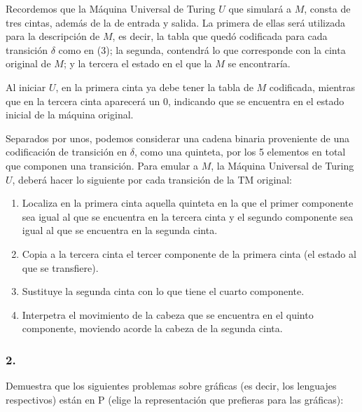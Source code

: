 \documentclass[12pt]{article}
\begin{document}
Recordemos que la Máquina Universal de Turing $U$ que simulará a $M$, consta de tres cintas, además de la de entrada y salida. La primera de ellas
será utilizada para la descripción de $M$, es decir, la tabla que quedó codificada para cada transición $\delta$ como en (3); la segunda, contendrá lo que corresponde con la cinta original de $M$; y la tercera el estado en el que la $M$ se encontraría.

Al iniciar $U$, en la primera cinta ya debe tener la tabla de $M$ codificada, mientras que en la tercera cinta aparecerá un 0, indicando que se encuentra en el estado inicial de la máquina original.

Separados por unos, podemos considerar una cadena binaria proveniente de una codificación de transición en $\delta$, como una quinteta, por los 5 elementos en total que componen una transición. Para emular a $M$, la Máquina Universal de Turing $U$, deberá hacer lo siguiente por cada
transición de la TM original:\\
\begin{enumerate}
\item Localiza en la primera cinta aquella quinteta en la que el primer componente sea igual al que se encuentra en la tercera cinta y el segundo
  componente sea igual al que se encuentra en la segunda cinta.
\item Copia a la tercera cinta el tercer componente de la primera cinta (el estado al que se transfiere).
\item Sustituye la segunda cinta con lo que tiene el cuarto componente.
\item Interpetra el movimiento de la cabeza que se encuentra en el quinto componente, moviendo acorde la cabeza de la segunda cinta. 
\end{enumerate}
\subsubsection*{2.}

 Demuestra que los siguientes problemas sobre gráficas (es decir, los lenguajes respectivos) están en P (elige la representación que prefieras para las gráficas):
 
\end{document}
